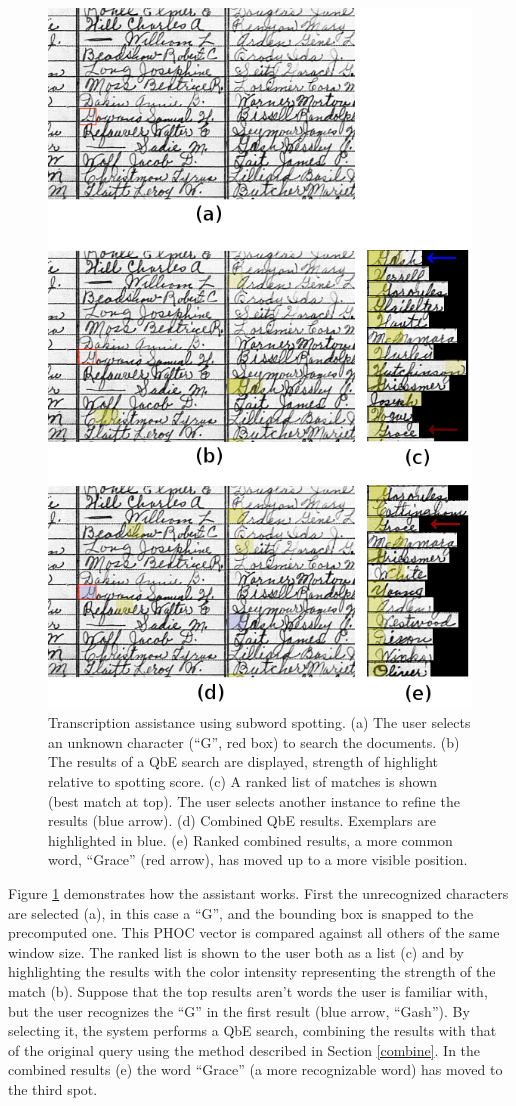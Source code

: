 \documentclass[ms,electronic,twosidetoc,letterpaper,chaptercenter,parttop,lof,lot]{byumsphd}
\begin{document}
\begin{figure}
    \centering
    \includegraphics[width=.65\textwidth]{assist_demo}
    \caption{Transcription assistance using subword spotting. (a) The user selects an unknown character (``G'', red box) to search the documents. (b) The results of a QbE search are displayed, strength of highlight relative to spotting score. (c) A ranked list of matches is shown (best match at top). The user selects another instance to refine the results (blue arrow). (d) Combined QbE results. Exemplars are highlighted in blue. (e) Ranked combined results, a more common word, ``Grace'' (red arrow), has moved up to a more visible position.}
    \label{fig:assist_demo}
\end{figure}

Figure \ref{fig:assist_demo} demonstrates how the assistant works. First the unrecognized characters are selected (a), in this case a  ``G'', and the bounding box is snapped to the precomputed one. This PHOC vector is compared against all others of the same window size. The ranked list is shown to the user both as a list (c) and by highlighting the results with the color intensity representing the strength of the match (b). Suppose that the top results aren't words the user is familiar with, but the user recognizes the ``G'' in the first result (blue arrow, ``Gash''). By selecting it, the system performs a QbE search, combining the results with that of the original query using the method described in Section \ref{combine}. In the combined results (e) the word ``Grace'' (a more recognizable word) has moved to the third spot.
\end{document}
